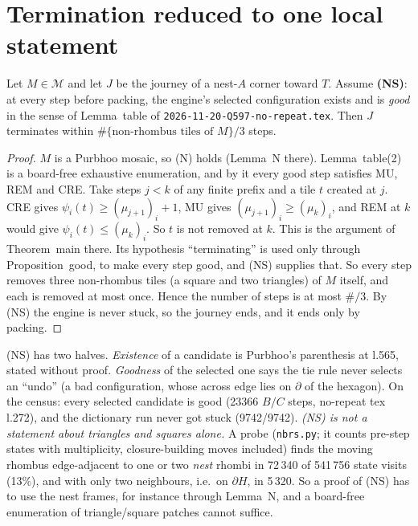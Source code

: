 \documentclass[11pt]{article}
\theoremstyle{definition}\newtheorem{definition}[theorem]{Definition}\newtheorem{remark}[theorem]{Remark}
\newcommand{\M}{\mathcal M}\newcommand{\F}{\mathcal F}
\begin{document}
\section{Termination reduced to one local statement}\label{sec:term}
\begin{proposition}\label{prop:term}
Let $M\in\M$ and let $J$ be the journey of a nest-$A$ corner toward $T$. Assume \textbf{(NS)}: at every step before packing, the engine's selected configuration exists and is \emph{good} in the sense of Lemma~table of \texttt{2026-11-20-Q597-no-repeat.tex}. Then $J$ terminates within $\#\{\text{non-rhombus tiles of }M\}/3$ steps.
\end{proposition}
\begin{proof}
$M$ is a Purbhoo mosaic, so (N) holds (Lemma~N there). Lemma~table(2) is a board-free exhaustive enumeration, and by it every good step satisfies MU, REM and CRE. Take steps $j<k$ of any finite prefix and a tile $t$ created at $j$. CRE gives $\psi_i(t)\ge(\mu_{j+1})_i+1$, MU gives $(\mu_{j+1})_i\ge(\mu_k)_i$, and REM at $k$ would give $\psi_i(t)\le(\mu_k)_i$. So $t$ is not removed at $k$. This is the argument of Theorem~main there. Its hypothesis ``terminating'' is used only through Proposition~good, to make every step good, and (NS) supplies that. So every step removes three non-rhombus tiles (a square and two triangles) of $M$ itself, and each is removed at most once. Hence the number of steps is at most $\#/3$. By (NS) the engine is never stuck, so the journey ends, and it ends only by packing.
\end{proof}
(NS) has two halves. \emph{Existence} of a candidate is Purbhoo's parenthesis at l.565, stated without proof. \emph{Goodness} of the selected one says the tie rule never selects an ``undo'' (a bad configuration, whose across edge lies on $\partial$ of the hexagon). On the census: every selected candidate is good (23366 $B/C$ steps, no-repeat tex l.272), and the dictionary run never got stuck (9742/9742). \emph{(NS) is not a statement about triangles and squares alone.} A probe (\texttt{nbrs.py}; it counts pre-step states with multiplicity, closure-building moves included) finds the moving rhombus edge-adjacent to one or two \emph{nest} rhombi in 72\,340 of 541\,756 state visits (13\%), and with only two neighbours, i.e.\ on $\partial H$, in 5\,320. So a proof of (NS) has to use the nest frames, for instance through Lemma~N, and a board-free enumeration of triangle/square patches cannot suffice.
\end{document}
